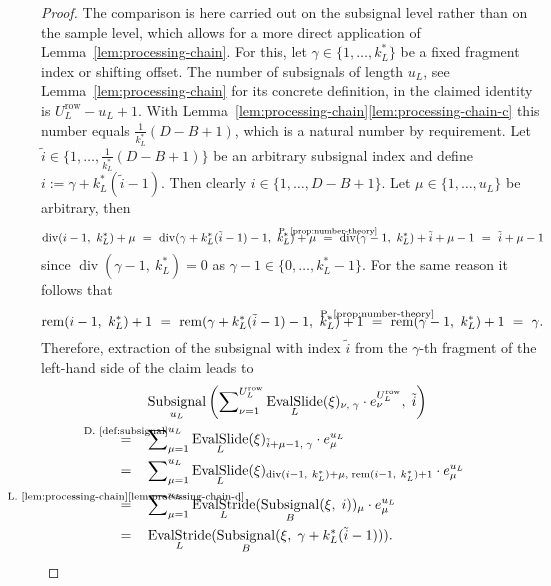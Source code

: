 \documentclass[journal]{IEEEtran}
\newcommand{\ROI}{B}
\newcommand{\discint}[2]{\{#1,\dotsc,#2\}}
\newcommand{\inint}[2]{\in\discint{#1}{#2}}
\DeclareMathOperator{\Subsignal}{Subsignal}
\DeclareMathOperator{\EvalStride}{EvalStride}
\DeclareMathOperator{\EvalSlide}{EvalSlide}
\renewcommand{\div}[2]{\operatorname{div}(#1,\ #2)}
\newcommand{\rem}[2]{\operatorname{rem}(#1,\ #2)}
\newcommand{\row}{\operatorname{row}}
\newcommand{\equsing}[1]{\overset{\mathclap{\text{#1}}}{=}}
\begin{document}
\begin{proof}
The comparison is here carried out on the subsignal level rather than on the sample level, which allows for a more direct application of Lemma~\ref{lem:processing-chain}.
For this, let $\gamma\inint{1}{k_L^*}$ be a fixed fragment index or shifting offset.
The number of subsignals of length $u_L$, see Lemma~\ref{lem:processing-chain} for its concrete definition, in the claimed identity is $U_L^{\row} - u_L + 1$.
With Lemma~\ref{lem:processing-chain}\ref{lem:processing-chain-c} this number equals $\frac{1}{k_L^*}(D - \ROI + 1)$, which is a natural number by requirement.
Let $\tilde{i}\inint{1}{\frac{1}{k_L^*}(D - \ROI + 1)}$ be an arbitrary subsignal index and define $i := \gamma + k_L^*(\tilde{i} - 1)$.
Then clearly $i\inint{1}{D - \ROI + 1}$.
Let $\mu\inint{1}{u_L}$ be arbitrary, then
\begin{displaymath}
  \div{i - 1}{k_L^*} + \mu
  \ =\ \div{\gamma + k_L^*(\tilde{i} - 1) - 1}{k_L^*} + \mu
  \ \equsing{P.~\ref{prop:number-theory}}\ \div{\gamma - 1}{k_L^*} + \tilde{i} + \mu - 1
  \ =\ \tilde{i} + \mu - 1
\end{displaymath}
since $\div{\gamma - 1}{k_L^*} = 0$ as $\gamma - 1\inint{0}{k_L^* - 1}$.
For the same reason it follows that
\begin{displaymath}
  \rem{i - 1}{k_L^*} + 1
  \ =\ \rem{\gamma + k_L^*(\tilde{i} - 1) - 1}{k_L^*} + 1
  \ \equsing{P.~\ref{prop:number-theory}}\ \rem{\gamma - 1}{k_L^*} + 1
  \ =\ \gamma\text{.}
\end{displaymath}
Therefore, extraction of the subsignal with index $\tilde{i}$ from the $\gamma$-th fragment of the left-hand side of the claim leads to
\begin{align*}
  & \Subsignal_{u_L}\left(\sum\nolimits_{\nu = 1}^{U_L^{\row}} \EvalSlide_L(\xi)_{\nu,\;\gamma}\cdot e_\nu^{U_L^{\row}},\;\tilde{i}\right)\\
  \equsing{D.~\ref{def:subsignal}}\ \ \ & \sum\nolimits_{\mu = 1}^{u_L} \EvalSlide_L(\xi)_{\tilde{i} + \mu - 1,\;\gamma}\cdot e_\mu^{u_L}\\
  =\ \ \ & \sum\nolimits_{\mu = 1}^{u_L} \EvalSlide_L(\xi)_{\div{i - 1}{k_L^*} + \mu,\;\rem{i - 1}{k_L^*} + 1}\cdot e_\mu^{u_L}\\
  \equsing{L.~\ref{lem:processing-chain}\ref{lem:processing-chain-d}}\ \ \ & \sum\nolimits_{\mu = 1}^{u_L} \EvalStride_L(\Subsignal_\ROI(\xi,\; i))_\mu\cdot e_\mu^{u_L}\\
  =\ \ \ & \EvalStride_L(\Subsignal_\ROI(\xi,\; \gamma + k_L^*(\tilde{i} - 1)))\text{.}
\end{align*}


\end{proof}
\end{document}
